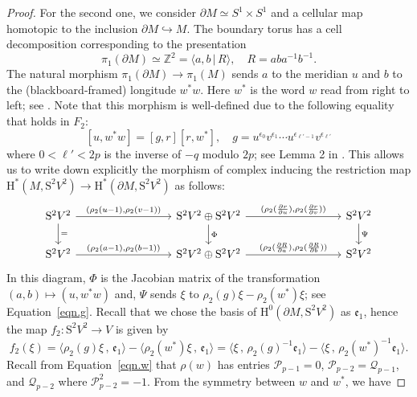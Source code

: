 \documentclass{amsart}
\newcommand{\Z}{\mathbb{Z}}
\renewcommand{\S}{\mathrm{S}}
\def\calP{\mathcal{P}}
\def\calQ{\mathcal{Q}}
\theoremstyle{definition}
\begin{document}
\begin{proof}
    For the second one, we consider $\partial M\simeq S^1\times S^1$ and a cellular map homotopic to the inclusion $\partial M \hookrightarrow M$. The boundary torus has a cell decomposition corresponding to the presentation  $$\pi_1(\partial M) \simeq \Z^2=\langle a,b\,|\,R\rangle, \quad  R=aba^{-1}b^{-1}.$$
    The natural morphism $\pi_1(\partial M) \to  \pi_1(M)$ sends $a$ to the meridian $u$ and $b$ to the (blackboard-framed) longitude $w^*w$. Here $w^*$ is the word $w$ read from right to left; see \cite[Prop.1] {Riley}. Note that this morphism is well-defined due to the following equality that holds in $F_2$: 
    \begin{equation}
        \label{eqn.g}
        [u,w^*w]=[g,r][r,w^*], \quad g=u^{\epsilon_0}v^{\epsilon_1}\cdots u^{\epsilon_{\ell'-1}}v^{\epsilon_{\ell'}}
    \end{equation} where $0<\ell'<2p$ is the inverse of $-q$ modulo $2p$; see Lemma 2 in \cite{vol2ponts}. This allows us to write down explicitly the morphism of complex inducing the restriction map $\mathrm{H}^*(M,\S^2V^2)\to \mathrm{H}^*(\partial M,\S^2 V^2)$ as follows:
    \begin{equation*}
        \begin{tikzcd}[column sep=3cm]
        \S^2V^2 \ar[r,"{(\rho_2(u-1),\rho_2(v-1))}"] \ar["=",d]  & \S^2V^2\oplus \S^2V^2 \ar[r,"{(\rho_2(\frac{\partial r}{\partial u}),\rho_2(\frac{\partial r}{\partial v}))}"]\ar[d,"\Phi"]    & \S^2V^2 \ar[d,"\Psi"]\\
        \S^2V^2  \ar[r, "{(\rho_2(a-1),\rho_2(b-1))}"]   & \S^2V^2 \oplus \S^2V^2 \ar[r,"{(\rho_2(\frac{\partial R}{\partial a}),\rho_2(\frac{\partial R}{\partial b}))}"]          & \S^2V^2
        \end{tikzcd}    
    \end{equation*}
    In this diagram, $\Phi$ is the Jacobian matrix of the transformation $(a,b)\mapsto(u,w^*w)$ and,  $\Psi$ sends $\xi$ to $\rho_2(g)\xi-\rho_2(w^*)\xi$; see Equation~\eqref{eqn.g}. 
    Recall that we chose the basis of $\mathrm{H}^0(\partial M,\S^2V^2)$ as $\mathfrak{e}_1$, hence the map $f_2 : \S^2V^2 \rightarrow V$ is given by
    $$f_2(\xi) = \langle \rho_2(g)\xi \, ,\, \mathfrak{e}_1 \rangle - \langle \rho_2(w^\ast)\xi \, ,\, \mathfrak{e}_1 \rangle = \langle \xi \, ,\, \rho_2(g)^{-1}\mathfrak{e}_1 \rangle - \langle \xi \, ,\, \rho_2(w^\ast)^{-1}\mathfrak{e}_1 \rangle .$$ 
    Recall from Equation~\eqref{eqn.w} that $\rho(w)$ has entries $\calP_{p-1}=0$, $\calP_{p-2}=\calQ_{p-1}$, and $\calQ_{p-2}$ where $\calP_{p-2}^2=-1$. From the symmetry between $w$ and $w^\ast$, we have

\end{proof}
\end{document}
